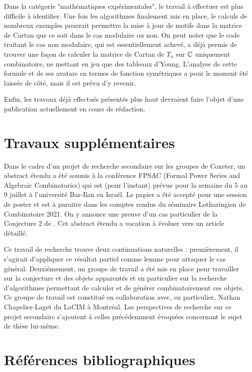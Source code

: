 \documentclass{article}
\begin{document}
	Dans la catégorie "mathématiques expérimentales", le travail à effectuer est plus difficile à identifier. Une fois les algorithmes finalement mis en place, le calculs de nombreux exemples pourrait permettre la mise à jour de motifs dans la matrice de Cartan que ce soit dans le cas modulaire ou non. On peut noter que le code traitant le cas non modulaire, qui est essentiellement achevé, a déjà permis de trouver une façon de calculer la matrice de Cartan de $T_n$ sur $\mathbb{C}$ uniquement combinatoire, ne mettant en jeu que des tableaux d'Young. L'analyse de cette formule et de ses avatars en termes de fonction symétriques a pour le moment été laissée de côté, mais il est prévu d'y revenir.
	
	Enfin, les travaux déjà effectués présentés plus haut devraient faire l'objet d'une publication actuellement en cours de rédaction.
	
		\section*{Travaux supplémentaires}
	
	Dans le cadre d'un projet de recherche secondaire sur les groupes de Coxeter, un abstract étendu \cite{Baba2020} a été soumis à la conférence FPSAC (Formal Power Series and Algebraic Combinatorics) qui est (pour l'instant) prévue pour la semaine du 5 au 9 juillet à l'université Bar-Ilan en Israël. Le papier a été accepté pour une session de poster et est à paraitre dans les comptes rendus du séminaire Lotharingien de Combinatoire 2021. On y annonce une preuve d'un cas particulier de la Conjecture 2 de \cite{dyer2016small}. Cet  abstract étendu a vocation à évoluer vers un article détaillé. 
	
	Ce travail de recherche trouve deux continuations naturelles : premièrement, il s'agirait d'appliquer ce résultat partiel comme lemme pour attaquer le cas général. Deuxièmement, un groupe de travail a été mis en place pour travailler sur la conjecture et des objets apparentés et en particulier sur la recherche d'algorithmes permettant de calculer et de générer combinatoirement ces objets. Ce groupe de travail est constitué en collaboration avec, en particulier, Nathan Chapelier-Laget du LaCIM à Montréal. Les perspectives de recherche sur ce projet secondaire s'ajoutent à celles précédemment évoquées concernant le sujet de thèse lui-même.
	
	\clearpage
	
	\section*{Références bibliographiques}
	
	\printbibliography
	
\end{document}
